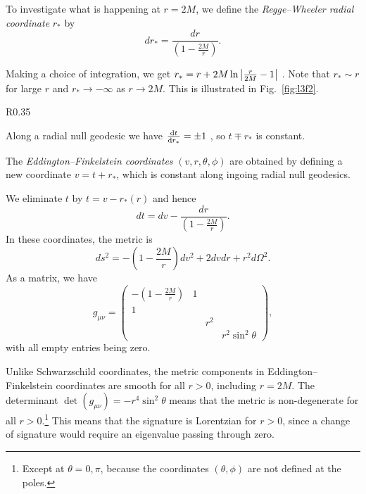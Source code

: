  \begin{definition}
  To investigate what is happening at $r = 2M$, we define the  \emph{Regge--Wheeler radial coordinate} $r_*$ by
   \begin{equation}
     dr_* = \frac{dr}{\left( 1 - \frac{2M}{r} \right)}.
  \end{equation}
\end{definition}
Making a choice of integration, we get $r_* = r + 2M \ln \abs{\frac{r}{2M} - 1}$ .
Note that $r_* \sim r$  for large $r$ and  $r_* \to - \infty$  as $r \to 2M$. This is illustrated in Fig.~\ref{fig:l3f2}.
\begin{wrapfigure}{R}{0.35\columnwidth}
  \centering
  \def\svgwidth{0.3\columnwidth}
  
  \caption{Regge--Wheeler radial coordinates.}
  \label{fig:l3f2}
\end{wrapfigure}
Along a radial null geodesic we have  $\dv{t}{r_*} = \pm 1$ , so $t \mp r_*$ is constant.
\begin{definition}
  The \emph{Eddington--Finkelstein coordinates} $(v, r, \theta, \phi)$ are obtained by defining a new coordinate $v = t + r_*$, which is constant along ingoing radial null geodesics. 
\end{definition}
We eliminate $t$ by $t = v - r_*(r)$ and hence
\begin{equation}
  dt = dv - \frac{dr}{\left( 1 - \frac{2M}{r} \right)}.
\end{equation}
In these coordinates, the metric is
\begin{equation}
  \label{eq:3-2}
  ds^2 = - \left( 1 - \frac{2M}{r} \right) dv^2 + 2 dv dr + r^2 d\Omega^2.
\end{equation}
As a matrix, we have
\begin{equation}
  g_{\mu\nu} = 
  \begin{pmatrix}
    - \left( 1 - \frac{2M}{r} \right) & 1 &  &  \\
   1 &  &  &  \\
    &  & r^2 &  \\
    &  &  & r^2 \sin^2 \theta
  \end{pmatrix},
\end{equation}
with all empty entries being zero.

Unlike Schwarzschild coordinates, the metric components in Eddington--Finkelstein coordinates are smooth for all  $r > 0$, including  $r = 2M$.
The determinant  $\det (g_{\mu\nu}) = -r^4 \sin^2 \theta$  means that the metric is non-degenerate for all $r > 0$.\footnote{Except at $\theta = 0, \pi$, because the coordinates $(\theta, \phi)$ are not defined at the poles.}
This means that the signature is Lorentzian for  $r > 0$, since a change of signature would require an eigenvalue passing through zero.

